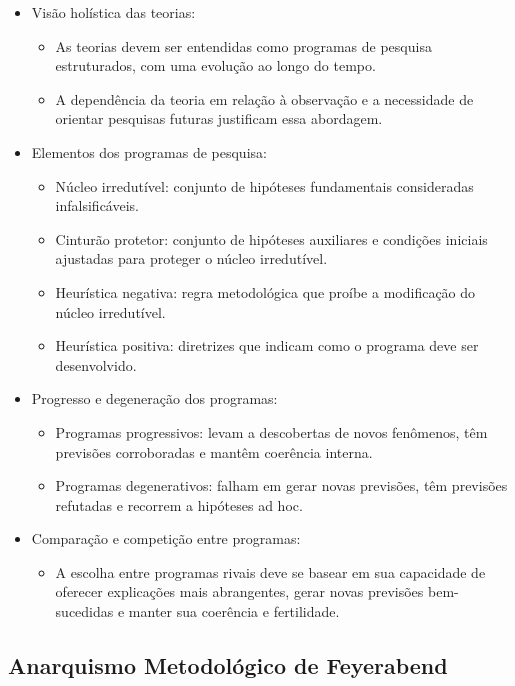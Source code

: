 \begin{itemize}
    \item Visão holística das teorias:
    \begin{itemize}
        \item As teorias devem ser entendidas como programas de pesquisa estruturados, com uma evolução ao longo do tempo.
        \item A dependência da teoria em relação à observação e a necessidade de orientar pesquisas futuras justificam essa abordagem.
    \end{itemize}
    \item Elementos dos programas de pesquisa:
    \begin{itemize}
        \item Núcleo irredutível: conjunto de hipóteses fundamentais consideradas infalsificáveis.
        \item Cinturão protetor: conjunto de hipóteses auxiliares e condições iniciais ajustadas para proteger o núcleo irredutível.
        \item Heurística negativa: regra metodológica que proíbe a modificação do núcleo irredutível.
        \item Heurística positiva: diretrizes que indicam como o programa deve ser desenvolvido.
    \end{itemize}
    \item Progresso e degeneração dos programas:
    \begin{itemize}
        \item Programas progressivos: levam a descobertas de novos fenômenos, têm previsões corroboradas e mantêm coerência interna.
        \item Programas degenerativos: falham em gerar novas previsões, têm previsões refutadas e recorrem a hipóteses ad hoc.
    \end{itemize}
    \item Comparação e competição entre programas:
    \begin{itemize}
        \item A escolha entre programas rivais deve se basear em sua capacidade de oferecer explicações mais abrangentes, gerar novas previsões bem-sucedidas e manter sua coerência e fertilidade.
    \end{itemize}
\end{itemize}

\subsection{Anarquismo Metodológico de Feyerabend}


